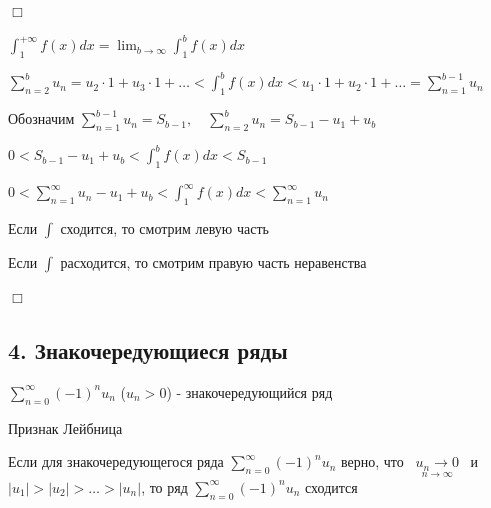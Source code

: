 \documentclass[12pt]{article}
\begin{document}
    \begin{MyProof}
        $\Box$

        $\int_1^{+\infty} f(x) dx = \lim_{b \to \infty} \int_1^b f(x) dx$

        $\sum_{n = 2}^b u_n = u_2 \cdot 1 + u_3 \cdot 1 + \dots < \int_1^b f(x) dx < u_1 \cdot 1 + u_2 \cdot 1 + \dots = \sum_{n = 1}^{b - 1} u_n$

        Обозначим $\sum_{n = 1}^{b - 1} u_n = S_{b - 1}, \quad \sum_{n = 2}^{b} u_n = S_{b - 1} - u_1 + u_b$

        $0 < S_{b - 1} - u_1 + u_b < \int_1^b f(x) dx < S_{b - 1}$

        $0 < \sum_{n = 1}^{\infty} u_n - u_1 + u_b < \int_1^\infty f(x) dx < \sum_{n = 1}^\infty u_n$

        Если $\int$ сходится, то смотрим левую часть

        Если $\int$ расходится, то смотрим правую часть неравенства

        $\Box$
    \end{MyProof}

    \hypertarget{alternatingsignseries}{}

    \subsection{4. Знакочередующиеся ряды}

    \Def $\sum_{n = 0}^\infty (-1)^n u_n$ ($u_n > 0$) - знакочередующийся ряд

    \hypertarget{leibniztheorem}{}

    \begin{MyTheorem}
        \Ths Признак Лейбница

        Если для знакочередующегося ряда $\sum_{n = 0}^\infty (-1)^n u_n$ верно,
        что \ $\underset{n \to \infty}{u_n \to 0}$ \ и \ $|u_1| > |u_2| > \dots > |u_n|$,
        то ряд $\sum_{n = 0}^\infty (-1)^n u_n$ сходится
    \end{MyTheorem}

\end{document}
